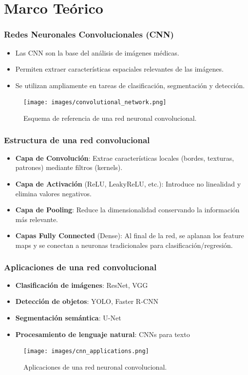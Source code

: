 
\section{Marco Teórico}

\begin{frame}
\frametitle{Redes Neuronales Convolucionales (CNN)}
\begin{itemize}
    \item Las CNN son la base del análisis de imágenes médicas.
    \item Permiten extraer características espaciales relevantes de las imágenes.
    \item Se utilizan ampliamente en tareas de clasificación, segmentación y detección.
\end{itemize}
\begin{figure}[ht!]
    \centering
    \texttt{[image: images/convolutional\_network.png]}
    \caption{Esquema de referencia de una red neuronal convolucional.}
\end{figure}
\end{frame}

\begin{frame}
\frametitle{Estructura de una red convolucional}
\begin{itemize}
    \item \textbf{Capa de Convolución}: Extrae características locales (bordes, texturas, patrones) mediante filtros (kernels).
    \item \textbf{Capa de Activación} (ReLU, LeakyReLU, etc.): Introduce no linealidad y elimina valores negativos.
    \item \textbf{Capa de Pooling}: Reduce la dimensionalidad conservando la información más relevante.
    \item \textbf{Capas Fully Connected} (Dense): Al final de la red, se aplanan los feature maps y se conectan a neuronas tradicionales para clasificación/regresión.
\end{itemize}
\end{frame}

\begin{frame}
\frametitle{Aplicaciones de una red convolucional}
\begin{itemize}
    \item \textbf{Clasificación de imágenes}: ResNet, VGG
    \item \textbf{Detección de objetos}: YOLO, Faster R-CNN
    \item \textbf{Segmentación semántica}: U-Net
    \item \textbf{Procesamiento de lenguaje natural}: CNNs para texto
\end{itemize}
\begin{figure}[ht!]
    \centering
    \texttt{[image: images/cnn\_applications.png]}
    \caption{Aplicaciones de una red neuronal convolucional.}
\end{figure}
\end{frame}

